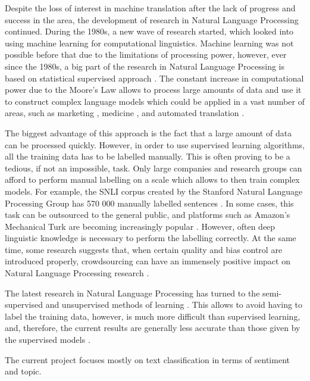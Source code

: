 Despite the loss of interest in machine translation after the lack of progress and success in the area, the development of research in Natural Language Processing continued. During the 1980s, a new wave of research started, which looked into using machine learning for computational linguistics. Machine learning was not possible before that due to the limitations of processing power, however, ever since the 1980s, a big part of the research in Natural Language Processing is based on statistical supervised approach \cite{mcqueen1995applying, bergsma2010creating}. The constant increase in computational power due to the Moore's Law allows to process large amounts of data and use it to construct complex language models which could be applied in a vast number of areas, such as marketing \cite{goldberg1999automated}, medicine \cite{demner2009can}, and automated translation \cite{brants2007large}.

The biggest advantage of this approach is the fact that a large amount of data can be processed quickly. However, in order to use supervised learning algorithms, all the training data has to be labelled manually. This is often proving to be a tedious, if not an impossible, task. Only large companies and research groups can afford to perform manual labelling on a scale which allows to then train complex models. For example, the SNLI corpus created by the Stanford Natural Language Processing Group has 570 000 manually labelled sentences \cite{ferrero2017compilig}. In some cases, this task can be outsourced to the general public, and platforms such as Amazon's Mechanical Turk are becoming increasingly popular \cite{callison2010creating}. However, often deep linguistic knowledge is necessary to perform the labelling correctly. At the same time, some research suggests that, when certain quality and bias control are introduced properly, crowdsourcing can have an immensely positive impact on Natural Language Processing research \cite{sabou2012crowdsourcing, snow2008cheap}.

The latest research in Natural Language Processing has turned to the semi-supervised and unsupervised methods of learning \cite{liang2005semi, turian2010word}. This allows to avoid having to label the training data, however, is much more difficult than supervised learning, and, therefore, the current results are generally less accurate than those given by the supervised models \cite{lapata2005web}.

The current project focuses mostly on text classification in terms of sentiment and topic. 

